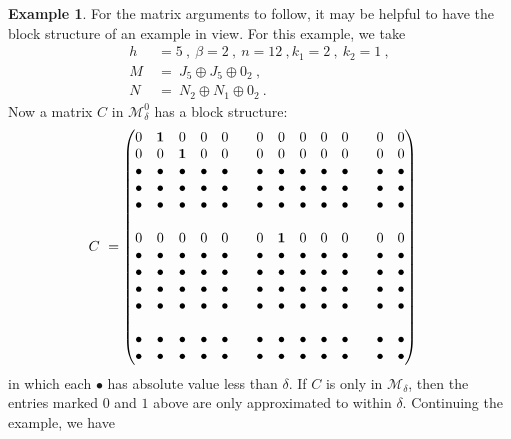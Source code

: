 \documentclass{amsart}
\theoremstyle{definition}
\newtheorem{example}[theorem]{Example}
\theoremstyle{remark}
\newcommand{\bu}{\bullet}
\numberwithin{equation}{section}
\begin{document}
{{\begin{example} \label{blockexample} 
For the matrix arguments to follow, it may be helpful to 
have the block structure of an example in view. 
For this example, we take 
\begin{align*} 
h \ & =  5 \ , \ \beta =2 \ , \ n=12 \ , k_1= 2 \ , \ k_2=1\ , \\ 
M \ &=\ J_5 \oplus J_5\oplus 0_2 \ , \\ 
N\ &=\ N_2 \oplus N_1 \oplus 0_2 \ .
\end{align*} 
Now a matrix $C$ in $\mathcal M^0_{\delta }$ has a block structure: 
\begin{align*}\label{samplec} 
\setcounter{MaxMatrixCols}{14} 
C\ &= 
\begin{pmatrix} 
0&\mathbf 1 &0&0&0&& 0&0&0&0&0&& 0&0 \\
0&0&\mathbf 1 &0&0&& 0&0&0&0&0&& 0&0 \\ 
\bu &\bu &\bu &\bu &\bu & &\bu &\bu &\bu &\bu &\bu & &\bu &\bu \\ 
\bu &\bu &\bu &\bu &\bu & &\bu &\bu &\bu &\bu &\bu & &\bu &\bu \\ 
\bu &\bu &\bu &\bu &\bu & &\bu &\bu &\bu &\bu &\bu & &\bu &\bu \\ 
 & & & & &  & & & & &  & & & \\
0&0&0& 0&0& &0&\mathbf 1 &0&0&0& &0&0 \\
\bu &\bu &\bu &\bu &\bu & &\bu &\bu &\bu &\bu &\bu & &\bu &\bu \\ 
\bu &\bu &\bu &\bu &\bu & &\bu &\bu &\bu &\bu &\bu & &\bu &\bu \\ 
\bu &\bu &\bu &\bu &\bu & &\bu &\bu &\bu &\bu &\bu & &\bu &\bu \\ 
\bu &\bu &\bu &\bu &\bu & &\bu &\bu &\bu &\bu &\bu & &\bu &\bu \\ 
 & & & & &  & & & & &  & & & \\
\bu &\bu &\bu &\bu &\bu & &\bu &\bu &\bu &\bu &\bu & &\bu &\bu \\ 
\bu &\bu &\bu &\bu &\bu & &\bu &\bu &\bu &\bu &\bu & &\bu &\bu 
\end{pmatrix} 
\end{align*}
in which each $\bu$ has absolute value less than $\delta$.
If $C$ is only in $\mathcal M_{\delta}$, then the entries marked 
$0$ and $1$ above are only approximated to within $\delta$. 
Continuing the example, we have 

\end{example}}}
\end{document}
